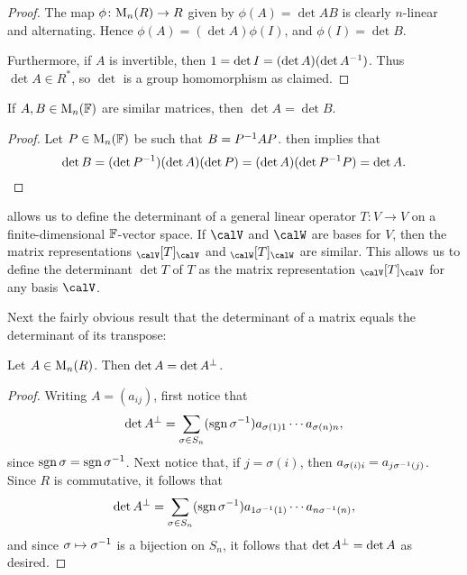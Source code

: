 \begin{proof}
    The map $\phi \colon \mat{n}{R} \to R$ given by $\phi(A) = \det AB$ is clearly $n$-linear and alternating. Hence $\phi(A) = (\det A) \phi(I)$, and $\phi(I) = \det B$.

    Furthermore, if $A$ is invertible, then $1 = \det I = (\det A) (\det A^{-1})$. Thus $\det A \in R^*$, so $\det$ is a group homomorphism as claimed.
\end{proof}


\begin{corollary}
    \label{cor:determinant-similar-matrices}
    If $A,B \in \mathrm{M}_{n}(\mathbb{F})$ are similar matrices, then $\det A = \det B$.
\end{corollary}

\begin{proof}
    Let $P \in \mathrm{M}_{n}(\mathbb{F})$ be such that $B = P^{-1}AP$.  then implies that
    \begin{equation*}
        \det B
            = (\det P^{-1})(\det A)(\det P)
            = (\det A)(\det P^{-1}P)
            = \det A.
    \end{equation*}
\end{proof}

 allows us to define the determinant of a general linear operator $T \colon V \to V$ on a finite-dimensional $\mathbb{F}$-vector space. If $\calV$ and $\calW$ are bases for $V$, then the matrix representations $\mr{\calV}{T}{\calV}$ and $\mr{\calW}{T}{\calW}$ are similar. This allows us to define the determinant $\det T$ of $T$ as the matrix representation $\mr{\calV}{T}{\calV}$ for any basis $\calV$.

Next the fairly obvious result that the determinant of a matrix equals the determinant of its transpose:

\begin{proposition}
    Let $A \in \mathrm{M}_{n}(R)$. Then $\det A = \det A^\bot$.
\end{proposition}

\begin{proof}
    Writing $A = (a_{ij})$, first notice that
    \begin{equation*}
        \det A^\bot
            = \sum_{\sigma \in S_n} (\operatorname{sgn} \sigma^{-1}) a_{\sigma(1)1} \cdots a_{\sigma(n)n},
    \end{equation*}
    since $\operatorname{sgn} \sigma = \operatorname{sgn} \sigma^{-1}$. Next notice that, if $j = \sigma(i)$, then $a_{\sigma(i)i} = a_{j \sigma^{-1}(j)}$. Since $R$ is commutative, it follows that
    \begin{equation*}
        \det A^\bot
            = \sum_{\sigma \in S_n} (\operatorname{sgn} \sigma^{-1}) a_{1\sigma^{-1}(1)} \cdots a_{n\sigma^{-1}(n)},
    \end{equation*}
    and since $\sigma \mapsto \sigma^{-1}$ is a bijection on $S_n$, it follows that $\det A^\bot = \det A$ as desired.
\end{proof}



